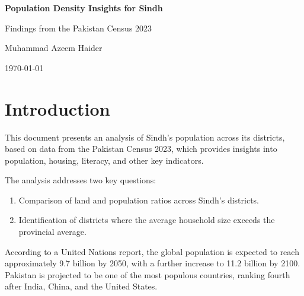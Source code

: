 \documentclass{article}
\begin{document}
\begin{titlepage}
    \centering
    \vspace*{9cm} %
    {\Huge \textbf{Population Density Insights for Sindh}\par}
    \vspace{0.5cm}
    {\Large Findings from the Pakistan Census 2023\par}
    
    \vfill
    {\Large Muhammad Azeem Haider\par}
    \vspace{0.5cm}
    {\Large \today\par}
\end{titlepage}

\section*{Introduction}
This document presents an analysis of Sindh's population across its districts, based on data from the Pakistan Census 2023, which provides insights into population, housing, literacy, and other key indicators.

\vspace{0.5cm}

\noindent The analysis addresses two key questions:

\begin{enumerate}
    \item Comparison of land and population ratios across Sindh's districts.
    \item Identification of districts where the average household size exceeds the provincial average.
\end{enumerate}

\noindent According to a United Nations report, the global population is expected to reach approximately 9.7 billion by 2050, with a further increase to 11.2 billion by 2100. Pakistan is projected to be one of the most populous countries, ranking fourth after India, China, and the United States.
\end{document}
